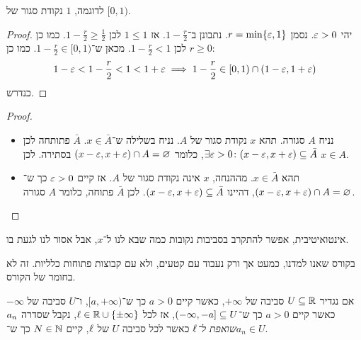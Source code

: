 \documentclass[name=רשימות חשבון דיפרנציאלי ואינטגרלי 1א]{../../../tex/classes/megasumPreamble}
\begin{document}
	לדוגמה, $1$ נקודת סגור של $[0, 1)$.
	\begin{proof}
		יהי $\eg > 0$. נסמן $r = \min \{\eg, 1\}$. נתבונן ב־$1 - \frac{r}{2}$. אז $1 \le 1$ לכן $1 - \frac{r}{2} \ge \frac{1}{2}$. כמו כן $r \ge 0$ לכן $1 - \frac{r}{2} < 1$. מכאן ש־$1 - \frac{r}{2} \in [0, 1)$. כמו כן:
		\[ 1 - \eg < 1 - \frac{r}{2} < 1 < 1 + \eg \implies 1 - \frac{r}{2} \in [0, 1) \cap (1 - \eg, 1 + \eg) \]
		כנדרש.
	\end{proof}

	\begin{proof}
		\begin{itemize}
			\item[$\impliedby$]נניח $A$ סגורה. תהא $x$ נקודת סגור של $A$. נניח בשלילה ש־$x \in \bar A$. $\bar A$ פתותחה לכן $\exists \eg > 0 \co (x - \eg, x + \eg) \subseteq \bar A$, כלומר $(x - \eg, x +\eg) \cap A = \varnothing$ בסתירה. לכן $x \in A$.
			\item[$\implies$]תהא $x \in \bar A$. מההנחה, $x$ אינה נקודת סגור של $A$. אז קיים $\eg > 0$ כך ש־$(x - \eg, x + \eg) \cap A = \varnothing$, דהיינו $(x - \eg, x +\eg) \subseteq \bar A$. לכן $\bar A$ פתוחה, כלומר $A$ סגורה.
		\end{itemize}\envendproof
	\end{proof}


	אינטואיטיבית, אפשר להתקרב בסביבות נקובות כמה שבא לנו ל־$x$, אבל אסור לנו לגעת בו.

	בקורס שאנו למדנו, כמעט אך ורק נעבוד עם קטעים, ולא עם קבוצות פתוחות כלליות. זה לא בחומר של הקורס.

	אם נגדיר $U \subseteq \mathbb{R}$ סביבה של $+\infty$, כאשר קיים $a > 0$ כך ש־$[a, +\infty)$, ו־$U$ סביבה של $-\infty$ כאשר קיים $a > 0$ כך ש־$(-\infty, -a] \subseteq U$, אז לכל $\ell \in \mathbb{R} \cup \{\pm\infty\}$, נקבל שסדרה $a_n$ \textit{שואפת ל־$\ell$} כאשר לכל סביבה $U$ של $\ell$, קיים $N \in \mathbb{N}$ כך ש־$a_n \in U$.
\end{document}

